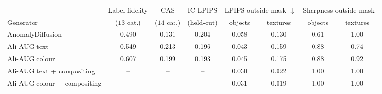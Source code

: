\begin{tabular}{@{}l c c c c c c c@{}}
\toprule
 & Label fidelity & CAS & IC-LPIPS & \multicolumn{2}{c}{LPIPS outside mask $\downarrow$} & \multicolumn{2}{c}{Sharpness outside mask} \\
\cmidrule(lr){5-6}\cmidrule(lr){7-8}
Generator & ($13$ cat.) & ($14$ cat.) & (held-out) & objects & textures & objects & textures \\
\midrule
AnomalyDiffusion & 0.490 & 0.131 & 0.204 & 0.058 & 0.130 & 0.61 & 1.00 \\
Ali-AUG text & 0.549 & 0.213 & 0.196 & 0.043 & 0.159 & 0.88 & 0.74 \\
Ali-AUG colour & 0.607 & 0.199 & 0.193 & 0.045 & 0.175 & 0.88 & 0.92 \\
Ali-AUG text + compositing & -- & -- & -- & 0.030 & 0.022 & 1.00 & 1.00 \\
Ali-AUG colour + compositing & -- & -- & -- & 0.031 & 0.019 & 1.00 & 1.00 \\
\bottomrule
\end{tabular}
